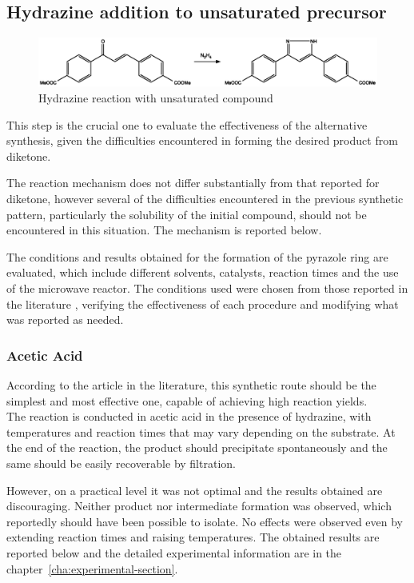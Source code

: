 \documentclass[../Master.tex]{subfiles}
\begin{document}
\subsection{Hydrazine addition to unsaturated precursor}\label{sec:hyd-add-ins}

\begin{figure}[h!]
	\centering
	\includegraphics[width=13cm,keepaspectratio]{Structures/pyrazole-form-alternative.eps}
	\caption{Hydrazine reaction with unsaturated compound}
\end{figure}

This step is the crucial one to evaluate the effectiveness of the alternative synthesis, given the difficulties encountered in forming the desired product from diketone.

The reaction mechanism does not differ substantially from that reported for diketone, however several of the difficulties encountered in the previous synthetic pattern, particularly the solubility of the initial compound, should not be encountered in this situation. The mechanism is reported below.

The conditions and results obtained for the formation of the pyrazole ring are evaluated, which include different solvents, catalysts, reaction times and the use of the microwave reactor. The conditions used were chosen from those reported in the literature \cite{leavai_synthesis_2002}, verifying the effectiveness of each procedure and modifying what was reported as needed.

\subsubsection{Acetic Acid}\label{sec:ace-cond}

According to the article in the literature, this synthetic route should be the simplest and most effective one, capable of achieving high reaction yields.\\ The reaction is conducted in acetic acid in the presence of hydrazine, with temperatures and reaction times that may vary depending on the substrate. At the end of the reaction, the product should precipitate spontaneously and the same should be easily recoverable by filtration.

However, on a practical level it was not optimal and the results obtained are discouraging. Neither product nor intermediate formation was observed, which reportedly should have been possible to isolate. No effects were observed even by extending reaction times and raising temperatures. The obtained results are reported below and the detailed experimental information are in the chapter\ \ref{cha:experimental-section}.
\end{document}
